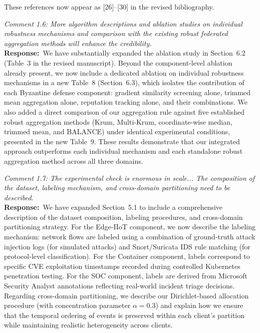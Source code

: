 \documentclass[12pt,a4paper]{article}
\newcommand{\RC}[1]{\noindent\textit{#1}\vspace{0.3em}\\}
\newcommand{\AR}{\noindent\textbf{Response:}~}
\begin{document}
These references now appear as [26]--[30] in the revised bibliography.

\vspace{0.8em}

\RC{Comment 1.6: More algorithm descriptions and ablation studies on individual robustness mechanisms and comparison with the existing robust federated aggregation methods will enhance the credibility.}

\AR We have substantially expanded the ablation study in Section~6.2 (Table~3 in the revised manuscript). Beyond the component-level ablation already present, we now include a dedicated ablation on individual robustness mechanisms in a new Table~8 (Section~6.3), which isolates the contribution of each Byzantine defense component: gradient similarity screening alone, trimmed mean aggregation alone, reputation tracking alone, and their combinations. We also added a direct comparison of our aggregation rule against five established robust aggregation methods (Krum, Multi-Krum, coordinate-wise median, trimmed mean, and BALANCE) under identical experimental conditions, presented in the new Table~9. These results demonstrate that our integrated approach outperforms each individual mechanism and each standalone robust aggregation method across all three domains.

\vspace{0.8em}

\RC{Comment 1.7: The experimental check is enormous in scale... The composition of the dataset, labeling mechanism, and cross-domain partitioning need to be described.}

\AR We have expanded Section~5.1 to include a comprehensive description of the dataset composition, labeling procedures, and cross-domain partitioning strategy. For the Edge-IIoT component, we now describe the labeling mechanism: network flows are labeled using a combination of ground-truth attack injection logs (for simulated attacks) and Snort/Suricata IDS rule matching (for protocol-level classification). For the Container component, labels correspond to specific CVE exploitation timestamps recorded during controlled Kubernetes penetration testing. For the SOC component, labels are derived from Microsoft Security Analyst annotations reflecting real-world incident triage decisions. Regarding cross-domain partitioning, we describe our Dirichlet-based allocation procedure (with concentration parameter $\alpha = 0.3$) and explain how we ensure that the temporal ordering of events is preserved within each client's partition while maintaining realistic heterogeneity across clients.
\end{document}
